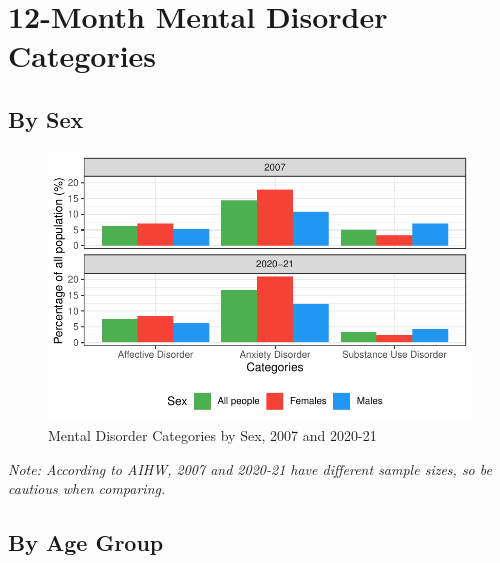\documentclass[
  a4paper,
  DIV=11,
  numbers=noendperiod]{scrreport}
\begin{document}
\hypertarget{month-mental-disorder-categories}{%
\section{12-Month Mental Disorder
Categories}\label{month-mental-disorder-categories}}

\hypertarget{by-sex-1}{%
\subsection{By Sex}\label{by-sex-1}}

\begin{figure}

\caption{\label{fig-12s}Mental Disorder Categories by Sex, 2007 and
2020-21}

{\centering \includegraphics{./chap1-prevalence-of-md_files/figure-pdf/fig-12s-1.pdf}

}

\end{figure}

\emph{Note: According to AIHW, 2007 and 2020-21 have different sample
sizes, so be cautious when comparing.}

\hypertarget{by-age-group-1}{%
\subsection{By Age Group}\label{by-age-group-1}}
\end{document}
